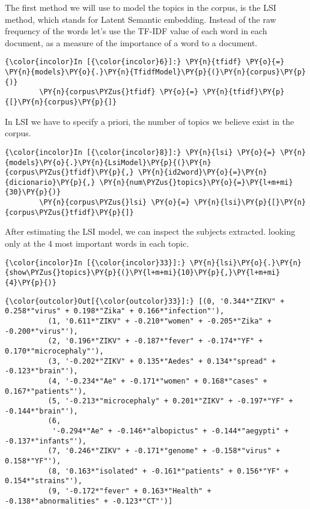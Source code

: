 The first method we will use to model the topics in the corpus, is the
LSI method, which stands for Latent Semantic embedding. Instead of the
raw frequency of the words let's use the TF-IDF value of each word in
each document, as a measure of the importance of a word to a document.

    \begin{Verbatim}[commandchars=\\\{\}]
{\color{incolor}In [{\color{incolor}6}]:} \PY{n}{tfidf} \PY{o}{=} \PY{n}{models}\PY{o}{.}\PY{n}{TfidfModel}\PY{p}{(}\PY{n}{corpus}\PY{p}{)}
        \PY{n}{corpus\PYZus{}tfidf} \PY{o}{=} \PY{n}{tfidf}\PY{p}{[}\PY{n}{corpus}\PY{p}{]}
\end{Verbatim}

    In LSI we have to specify a priori, the number of topics we believe
exist in the corpus.

    \begin{Verbatim}[commandchars=\\\{\}]
{\color{incolor}In [{\color{incolor}8}]:} \PY{n}{lsi} \PY{o}{=} \PY{n}{models}\PY{o}{.}\PY{n}{LsiModel}\PY{p}{(}\PY{n}{corpus\PYZus{}tfidf}\PY{p}{,} \PY{n}{id2word}\PY{o}{=}\PY{n}{dicionario}\PY{p}{,} \PY{n}{num\PYZus{}topics}\PY{o}{=}\PY{l+m+mi}{30}\PY{p}{)}
        \PY{n}{corpus\PYZus{}lsi} \PY{o}{=} \PY{n}{lsi}\PY{p}{[}\PY{n}{corpus\PYZus{}tfidf}\PY{p}{]}
\end{Verbatim}

    After estimating the LSI model, we can inspect the subjects extracted.
looking only at the 4 most important words in each topic.

    \begin{Verbatim}[commandchars=\\\{\}]
{\color{incolor}In [{\color{incolor}33}]:} \PY{n}{lsi}\PY{o}{.}\PY{n}{show\PYZus{}topics}\PY{p}{(}\PY{l+m+mi}{10}\PY{p}{,}\PY{l+m+mi}{4}\PY{p}{)}
\end{Verbatim}

            \begin{Verbatim}[commandchars=\\\{\}]
{\color{outcolor}Out[{\color{outcolor}33}]:} [(0, '0.344*"ZIKV" + 0.258*"virus" + 0.198*"Zika" + 0.166*"infection"'),
          (1, '0.611*"ZIKV" + -0.210*"women" + -0.205*"Zika" + -0.200*"virus"'),
          (2, '0.196*"ZIKV" + -0.187*"fever" + -0.174*"YF" + 0.170*"microcephaly"'),
          (3, '-0.202*"ZIKV" + 0.135*"Aedes" + 0.134*"spread" + -0.123*"brain"'),
          (4, '-0.234*"Ae" + -0.171*"women" + 0.168*"cases" + 0.167*"patients"'),
          (5, '-0.213*"microcephaly" + 0.201*"ZIKV" + -0.197*"YF" + -0.144*"brain"'),
          (6,
           '-0.294*"Ae" + -0.146*"albopictus" + -0.144*"aegypti" + -0.137*"infants"'),
          (7, '0.246*"ZIKV" + -0.171*"genome" + -0.158*"virus" + 0.158*"YF"'),
          (8, '0.163*"isolated" + -0.161*"patients" + 0.156*"YF" + 0.154*"strains"'),
          (9, '-0.172*"fever" + 0.163*"Health" + -0.138*"abnormalities" + -0.123*"CT"')]
\end{Verbatim}
        
